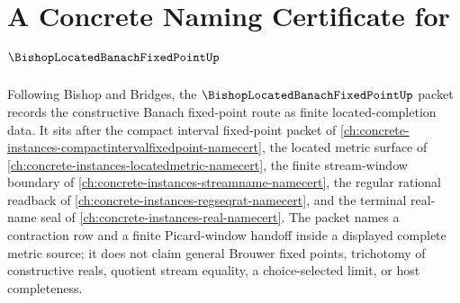 \chapter{A Concrete Naming Certificate for $\BishopLocatedBanachFixedPointUp$}
\label{ch:concrete-instances-bishop-located-banach-fixed-point-namecert}

Following Bishop and Bridges, the $\BishopLocatedBanachFixedPointUp$ packet records the constructive Banach fixed-point route as finite located-completion data. It sits after the compact interval fixed-point packet of \autoref{ch:concrete-instances-compactintervalfixedpoint-namecert}, the located metric surface of \autoref{ch:concrete-instances-locatedmetric-namecert}, the finite stream-window boundary of \autoref{ch:concrete-instances-streamname-namecert}, the regular rational readback of \autoref{ch:concrete-instances-regseqrat-namecert}, and the terminal real-name seal of \autoref{ch:concrete-instances-real-namecert}. The packet names a contraction row and a finite Picard-window handoff inside a displayed complete metric source; it does not claim general Brouwer fixed points, trichotomy of constructive reals, quotient stream equality, a choice-selected limit, or host completeness.

